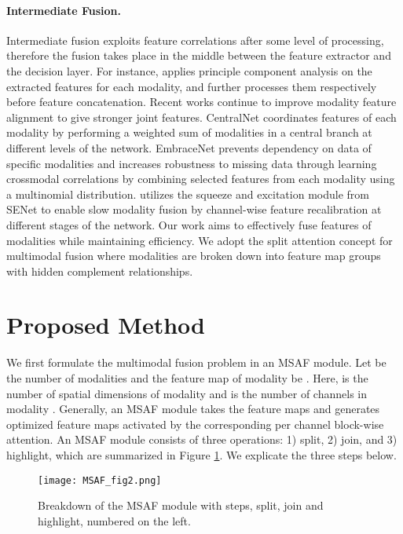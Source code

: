 \documentclass[10pt,twocolumn,letterpaper]{article}
\begin{document}
\paragraph{Intermediate Fusion.}
Intermediate fusion exploits feature correlations after some level of processing, therefore the fusion takes place in the middle between the feature extractor and the decision layer. For instance, \cite{williams2018dnn} applies principle component analysis on the extracted features for each modality, and further processes them respectively before feature concatenation. Recent works continue to improve modality feature alignment to give stronger joint features. CentralNet \cite{vielzeuf2018centralnet} coordinates features of each modality by performing a weighted sum of modalities in a central branch at different levels of the network. EmbraceNet \cite{choi2019embracenet} prevents dependency on data of specific modalities and increases robustness to missing data through learning crossmodal correlations by combining selected features from each modality using a multinomial distribution. \cite{joze2020mmtm} utilizes the squeeze and excitation module from SENet \cite{hu2018squeeze} to enable slow modality fusion by channel-wise feature recalibration at different stages of the network. Our work aims to effectively fuse features of modalities while maintaining efficiency. We adopt the split attention \cite{zhang2020resnest} concept for multimodal fusion where modalities are broken down into feature map groups with hidden complement relationships. 

\section{Proposed Method}
We first formulate the multimodal fusion problem in an MSAF module. Let  be the number of modalities and the feature map of modality  be . Here,  is the number of spatial dimensions of modality  and  is the number of channels in modality . Generally, an MSAF module takes the feature maps  and generates optimized feature maps  activated by the corresponding per channel block-wise attention. An MSAF module consists of three operations: 1) split, 2) join, and 3) highlight, which are summarized in Figure \ref{fig2}. We explicate the three steps below.

\begin{figure}[t]
\centering
\texttt{[image: MSAF\_fig2.png]} \caption{Breakdown of the MSAF module with steps, split, join and highlight, numbered on the left.}
\label{fig2}
\end{figure}
\end{document}
